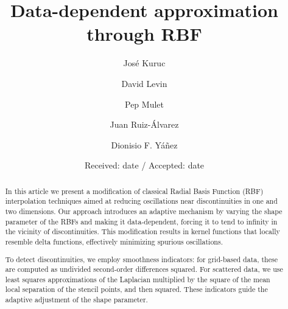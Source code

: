 \documentclass[preprint]{elsarticle}       %
\begin{document}
\small

\begin{frontmatter}

\title{Data-dependent approximation through RBF}

\author[UPCT]{Jos\'e Kuruc}
\author[TAU]{David Levin}
\author[UV]{Pep Mulet}
\author[UPCT]{Juan Ruiz-\'Alvarez}
\author[UV]{Dionisio F. Y\'a\~nez}

\date{Received: date / Accepted: date}

\address[UPCT]{Departamento de Matem\'atica Aplicada y Estad\'istica. Universidad  Polit\'ecnica de Cartagena, Cartagena (Spain).}
\address[TAU]{School of Mathematical Sciences. Tel-Aviv University, Tel-Aviv (Israel).}
\address[UV]{Departamento de Matem\'aticas. Universidad de Valencia, Valencia (Spain).}



\begin{abstract}
In this article we present a modification of classical Radial Basis Function (RBF) interpolation techniques aimed at reducing oscillations near discontinuities in one and two dimensions. Our approach introduces an adaptive mechanism by varying the shape parameter of the RBFs and making it data-dependent, forcing it to tend to infinity in the vicinity of discontinuities. This modification results in kernel functions that locally resemble %
delta functions, effectively minimizing spurious oscillations.

To detect discontinuities, we employ smoothness indicators: for grid-based data, these are computed as undivided second-order differences squared. For scattered data, we use least squares approximations of the Laplacian multiplied by the square of the mean local separation of the stencil points, and then squared. These indicators guide the adaptive adjustment of the shape parameter.


\end{abstract}
\end{frontmatter}
\end{document}
